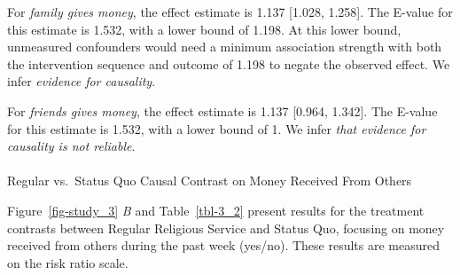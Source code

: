 \documentclass[
  single column]{article}
\makeatletter
\let\oldparagraph\paragraph
\renewcommand{\paragraph}{
    \@ifstar
      \xxxParagraphStar
      \xxxParagraphNoStar
  }
\newcommand{\xxxParagraphStar}[1]{\oldparagraph*{#1}\mbox{}}
\newcommand{\xxxParagraphNoStar}[1]{\oldparagraph{#1}\mbox{}}
\makeatother
\begin{document}
For \emph{family gives money}, the effect estimate is 1.137 {[}1.028,
1.258{]}. The E-value for this estimate is 1.532, with a lower bound of
1.198. At this lower bound, unmeasured confounders would need a minimum
association strength with both the intervention sequence and outcome of
1.198 to negate the observed effect. We infer \emph{evidence for
causality}.

For \emph{friends gives money}, the effect estimate is 1.137 {[}0.964,
1.342{]}. The E-value for this estimate is 1.532, with a lower bound of
1. We infer \emph{that evidence for causality is not reliable}.

\paragraph{Regular vs.~Status Quo Causal Contrast on Money Received From
Others}\label{regular-vs.-status-quo-causal-contrast-on-money-received-from-others}

Figure~\ref{fig-study_3} \emph{B} and Table~\ref{tbl-3_2} present
results for the treatment contrasts between Regular Religious Service
and Status Quo, focusing on money received from others during the past
week (yes/no). These results are measured on the risk ratio scale.
\end{document}
